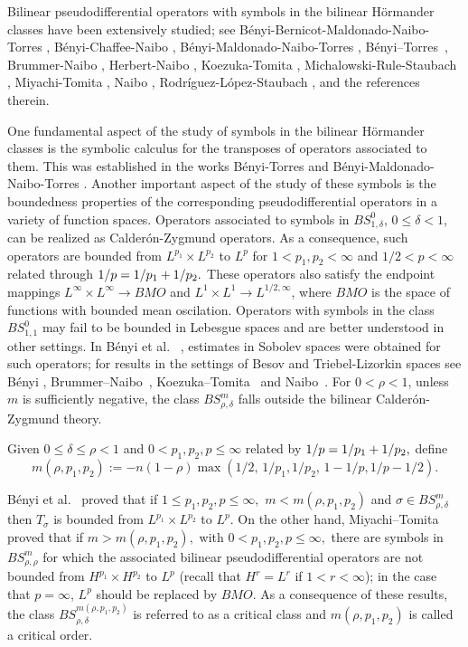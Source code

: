Bilinear pseudodifferential operators with symbols
in the bilinear H\"ormander classes have been extensively studied; see B\'enyi-Bernicot-Maldonado-Naibo-Torres \citep{MR3205530}, B\'enyi-Chaffee-Naibo \citep{benyi2018strongly}, B\'enyi-Maldonado-Naibo-Torres \citep{MR2660466}, B\'enyi--Torres~\cite{MR1986065, MR2046194}, Brummer-Naibo \citep{MR3750234}, Herbert-Naibo \citep{ MR3211086, MR3627725}, Koezuka-Tomita \citep{MR3750316}, Michalowski-Rule-Staubach \citep{MR3165300}, Miyachi-Tomita
\citep{MR3179688, MT1, MT2}, Naibo \cite{MR3393696, MR3411149}, Rodr\'iguez-L\'opez-Staubach \citep{MR3035059}, and the references therein.
 
One fundamental aspect of the study of symbols in the bilinear H\"ormander classes is the symbolic calculus for the transposes of operators associated to them. This was established in the works B\'enyi-Torres \citep{MR1986065} and B\'enyi-Maldonado-Naibo-Torres \citep{MR2660466}. Another important aspect of the study of these symbols is the boundedness properties of the corresponding pseudodifferential operators in a variety of function spaces. Operators associated to symbols in $BS^0_{1,\delta}$, $0\leq\delta < 1$, can be realized as Calder\'on-Zygmund operators. As a consequence, such operators are bounded from $L^{p_1} \times L^{p_2}$ to  $L^p$ for  $1 < p_1, p_2 < \infty$ and $1/2<p <\infty$ related through $1/p=1/p_1+1/p_2.$ These operators also satisfy the endpoint mappings $L^\infty \times L^\infty \rightarrow BMO$ and $L^1 \times L^1 \rightarrow L^{1/2, \infty}$, where $BMO$ is the space of functions with bounded mean oscilation. Operators with symbols in the class $BS^0_{1,1}$ may fail to be bounded in Lebesgue spaces and are better understood in other settings. In B\'enyi et al. ~\cite{MR2250054, MR1986065}, estimates in Sobolev spaces were obtained for such operators; for results in the settings of Besov and Triebel-Lizorkin spaces see B\'enyi \cite{MR1996120}, Brummer--Naibo~\cite{MR3750234}, Koezuka--Tomita~\cite{MR3750316} and Naibo~\cite{MR3393696}. For $0<\rho<1$, unless $m$ is sufficiently negative, the class $BS^m_{\rho,\delta}$ falls outside the bilinear Calder\'on-Zygmund theory. 


Given  $0\le \delta\le \rho< 1$  and $0< p_1,p_2,p\le \infty$  related   by $1/p=1/p_1+1/p_2,$ define 
$$
m(\rho, p_1,p_2):=-n(1-\rho)\max({1}/{2},\,{1}/{p_1},{1}/{p_2},\, 1-1/p, 1/p-1/2).
$$ 

\noindent B\'enyi et al.~\cite{MR3205530} proved that if $1\le p_1,p_2, p\le \infty,$    $m<m(\rho,p_1,p_2)$ and $\sigma\in BS^m_{\rho,\delta}$  then $T_\sigma$ is bounded from $L^{p_1}\times L^{p_2}$ to $L^p.$  On the other hand, Miyachi--Tomita~\cite{MR3179688} proved that  if $m>m(\rho, p_1,p_2),$ with $0< p_1,p_2,p\le \infty,$ there are symbols in $BS^m_{\rho,\rho}$ for which the associated  bilinear pseudodifferential operators are not bounded from $H^{p_1}\times H^{p_2}$ to $L^p$ (recall that $H^r = L^r$ if $1<r<\infty$); in the case that $p=\infty$, $L^p$ should be replaced by $BMO$. As a consequence of these results, the class $BS^{m(\rho,p_1,p_2)}_{\rho,\delta}$ is referred to as a critical class and $m(\rho,p_1,p_2)$ is called a critical order. 

